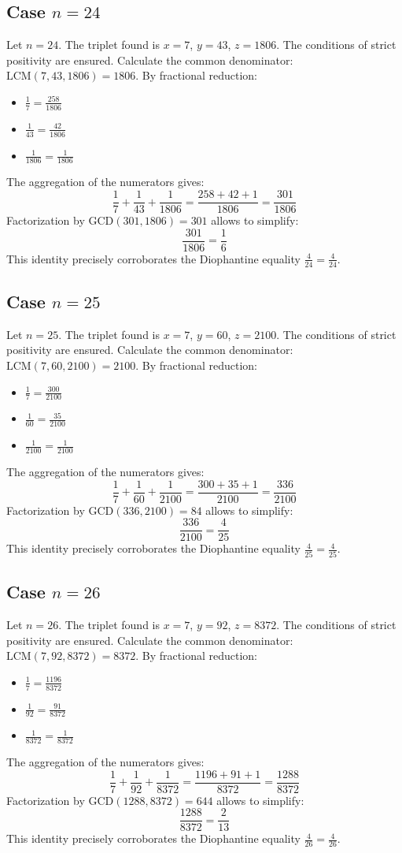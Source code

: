\documentclass[11pt,a4paper]{article}
\begin{document}
\subsection{Case $n = 24$}
Let $n = 24$. The triplet found is $x = 7$, $y = 43$, $z = 1806$.
The conditions of strict positivity are ensured.
Calculate the common denominator: $\text{LCM}(7, 43, 1806) = 1806$.
By fractional reduction:
\begin{itemize}
    \item $\frac{1}{7} = \frac{258}{1806}$
    \item $\frac{1}{43} = \frac{42}{1806}$
    \item $\frac{1}{1806} = \frac{1}{1806}$
\end{itemize}
The aggregation of the numerators gives:
$$ \frac{1}{7} + \frac{1}{43} + \frac{1}{1806} = \frac{258 + 42 + 1}{1806} = \frac{301}{1806} $$
Factorization by $\text{GCD}(301, 1806) = 301$ allows to simplify:
$$ \frac{301}{1806} = \frac{1}{6} $$
This identity precisely corroborates the Diophantine equality $\frac{4}{24} = \frac{4}{24}$.

\subsection{Case $n = 25$}
Let $n = 25$. The triplet found is $x = 7$, $y = 60$, $z = 2100$.
The conditions of strict positivity are ensured.
Calculate the common denominator: $\text{LCM}(7, 60, 2100) = 2100$.
By fractional reduction:
\begin{itemize}
    \item $\frac{1}{7} = \frac{300}{2100}$
    \item $\frac{1}{60} = \frac{35}{2100}$
    \item $\frac{1}{2100} = \frac{1}{2100}$
\end{itemize}
The aggregation of the numerators gives:
$$ \frac{1}{7} + \frac{1}{60} + \frac{1}{2100} = \frac{300 + 35 + 1}{2100} = \frac{336}{2100} $$
Factorization by $\text{GCD}(336, 2100) = 84$ allows to simplify:
$$ \frac{336}{2100} = \frac{4}{25} $$
This identity precisely corroborates the Diophantine equality $\frac{4}{25} = \frac{4}{25}$.

\subsection{Case $n = 26$}
Let $n = 26$. The triplet found is $x = 7$, $y = 92$, $z = 8372$.
The conditions of strict positivity are ensured.
Calculate the common denominator: $\text{LCM}(7, 92, 8372) = 8372$.
By fractional reduction:
\begin{itemize}
    \item $\frac{1}{7} = \frac{1196}{8372}$
    \item $\frac{1}{92} = \frac{91}{8372}$
    \item $\frac{1}{8372} = \frac{1}{8372}$
\end{itemize}
The aggregation of the numerators gives:
$$ \frac{1}{7} + \frac{1}{92} + \frac{1}{8372} = \frac{1196 + 91 + 1}{8372} = \frac{1288}{8372} $$
Factorization by $\text{GCD}(1288, 8372) = 644$ allows to simplify:
$$ \frac{1288}{8372} = \frac{2}{13} $$
This identity precisely corroborates the Diophantine equality $\frac{4}{26} = \frac{4}{26}$.
\end{document}
